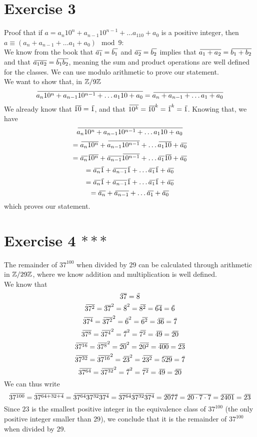 \documentclass[12pt]{article}
\begin{document}
    \section*{Exercise 3}
    Proof that if $a = a_n10^n + a_{n-1}10^{n-1} + \dots a_110 + a_0$
    is a positive integer,
    then $a \equiv (a_n + a_{n-1} + \dots a_1 + a_0) \mod 9$: \\
    We know from the book that $\,\overline{\!{a_1}} = \,\overline{\!{b_1}}$
    and $\,\overline{\!{a_2}} = \,\overline{\!{b_2}}$
    implies that $\,\overline{\!{a_1+a_2}} = \,\overline{\!{b_1 + b_2}}$
    and that $\,\overline{\!{a_1a_2}} = \,\overline{\!{b_1b_2}}$,
    meaning the sum and product operations are well defined
    for the classes.
    We can use modulo arithmetic to prove our statement. \\
    We want to show that, in $\mathbb{Z}/9\mathbb{Z}$
    \[  \,\overline{\!{a_n10^n + a_{n-1}10^{n-1} + \dots a_110 + a_0}}
    = \,\overline{\!{a_n + a_{n-1} + \dots a_1 + a_0}} \]
    We already know that $\,\overline{\!{10}} = \,\overline{\!{1}}$,
    and that $\,\overline{\!{10^k}} = \,\overline{\!{10}}^k = \,\overline{\!{1}}^k = \,\overline{\!{1}}$.
    Knowing that, we have
    \[  \,\overline{\!{a_n10^n + a_{n-1}10^{n-1} + \dots a_110 + a_0}} \]
    \[ = \,\overline{\!{a_n10^n}} +  \,\overline{\!{a_{n-1}10^{n-1}}}
    + \dots  \,\overline{\!{a_110}} +  \,\overline{\!{a_0}} \]
    \[ = \,\overline{\!{a_n}}\,\overline{\!{10^n}} +  \,\overline{\!{a_{n-1}}}\,\overline{\!{10^{n-1}}}
    + \dots  \,\overline{\!{a_1}}\,\overline{\!{10}} +  \,\overline{\!{a_0}} \]
    \[ = \,\overline{\!{a_n}}\,\overline{\!{1}} +  \,\overline{\!{a_{n-1}}}\,\overline{\!{1}}
    + \dots  \,\overline{\!{a_1}}\,\overline{\!{1}} +  \,\overline{\!{a_0}} \]
    \[ = \,\overline{\!{a_n}}\,\overline{\!{1}} +  \,\overline{\!{a_{n-1}}}\,\overline{\!{1}}
    + \dots  \,\overline{\!{a_1}}\,\overline{\!{1}} +  \,\overline{\!{a_0}} \]
    \[ = \,\overline{\!{a_n}} +  \,\overline{\!{a_{n-1}}}
    + \dots  \,\overline{\!{a_1}} +  \,\overline{\!{a_0}} \]
    which proves our statement. \\

    \section*{Exercise 4 $***$}
    The remainder of $37^{100}$ when divided by $29$
    can be calculated through arithmetic in $\mathbb{Z}/29\mathbb{Z}$,
    where we know addition and multiplication is well defined. \\
    We know that
    \[ \,\overline{\!{37}} = \,\overline{\!{8}} \]
    \[ \,\overline{\!{37^2}} = \,\overline{\!{37}}^2 = \,\overline{\!{8}}^2
    = \,\overline{\!{8^2}} = \,\overline{\!{64}} = \,\overline{\!{6}} \]
    \[ \,\overline{\!{37^4}} = \,\overline{\!{37^2}}^2 = \,\overline{\!{6}}^2
    = \,\overline{\!{6^2}} = \,\overline{\!{36}} = \,\overline{\!{7}} \]
    \[ \,\overline{\!{37^8}} = \,\overline{\!{37^4}}^2 = \,\overline{\!{7}}^2
    = \,\overline{\!{7^2}} = \,\overline{\!{49}} = \,\overline{\!{20}} \]
    \[ \,\overline{\!{37^{16}}} = \,\overline{\!{37^8}}^2 = \,\overline{\!{20}}^2
    = \,\overline{\!{20^2}} = \,\overline{\!{400}} = \,\overline{\!{23}} \]
    \[ \,\overline{\!{37^{32}}} = \,\overline{\!{37^{16}}}^2 = \,\overline{\!{23}}^2
    = \,\overline{\!{23^2}} = \,\overline{\!{529}} = \,\overline{\!{7}} \]
    \[ \,\overline{\!{37^{64}}} = \,\overline{\!{37^{32}}}^2 = \,\overline{\!{7}}^2
    = \,\overline{\!{7^2}} = \,\overline{\!{49}} = \,\overline{\!{20}} \]
    We can thus write
    \[ \olsi{37^{100}} = \olsi{37^{64 + 32 + 4}}
    = \olsi{37^{64}37^{32}37^{4}}
    = \olsi{37^{64}}\olsi{37^{32}}\olsi{37^{4}} 
    = \olsi{20}\olsi{7}\olsi{7}
    = \olsi{20 \cdot 7 \cdot 7}
    = \olsi{2401} = \olsi{23} \]
    Since $23$ is the smallest positive integer in the equivalence
    class of $37^{100}$
    (the only positive integer smaller than $29$),
    we conclude that it is the remainder of $37^{100}$
    when divided by $29$. \\
\end{document}
